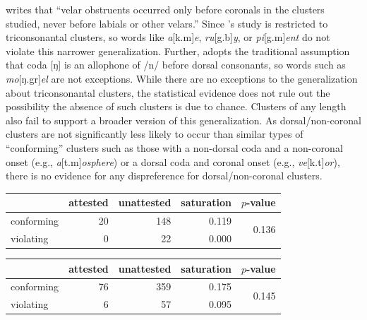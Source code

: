 \citet[][173]{Pierrehumbert1994} writes that ``velar obstruents occurred only before coronals in the clusters studied, never before labials or other velars.'' Since \citeauthor{Pierrehumbert1994}'s study is restricted to triconsonantal clusters, so words like \emph{a}[k.m]\emph{e}, \emph{ru}[g.b]\emph{y}, or \emph{pi}[g.m]\emph{ent} do not violate this narrower generalization. Further, \citeauthor{Pierrehumbert1994} adopts the traditional assumption \citep[e.g.,][66f.]{Borowsky1986} that coda [ŋ] is an allophone of /n/ before dorsal consonants, so words such as \emph{mo}[ŋ.gr]\emph{el} are not exceptions. While there are no exceptions to the generalization about triconsonantal clusters, the statistical evidence does not rule out the possibility the absence of such clusters is due to chance. Clusters of any length also fail to support a broader version of this generalization. As dorsal/non-coronal clusters are not significantly less likely to occur than similar types of ``conforming'' clusters such as those with a non-dorsal coda and a non-coronal onset (e.g., \emph{a}[t.m]\emph{osphere}) or a dorsal coda and coronal onset (e.g., \emph{ve}[k.t]\emph{or}), there is no evidence for any dispreference for dorsal/non-coronal clusters.

\begin{example}
\begin{tabular}{l r r r r}
\toprule
           & attested & unattested & saturation & $p$-value              \\
\midrule
conforming & 20       & 148        & 0.119      & \multirow{2}{*}{0.136} \\
violating  &  0       &  22        & 0.000                               \\
\bottomrule
\end{tabular}
\end{example}

\begin{example}
\begin{tabular}{l r r r r}
\toprule
           & attested & unattested & saturation & $p$-value \\
\midrule
conforming & 76 & 359 & 0.175 & \multirow{2}{*}{0.145} \\
violating  &  6 &  57 & 0.095 \\
\bottomrule
\end{tabular}
\end{example}


